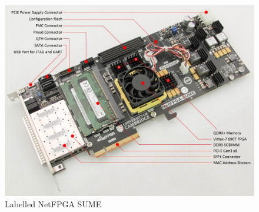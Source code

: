 \begin{figure}[t]
  \centering
  \includegraphics[width=\textwidth]{assets/netfpga_sume.jpg}
  \caption{Labelled NetFPGA SUME}
  \label{netfpga_sume_figure}
\end{figure}

